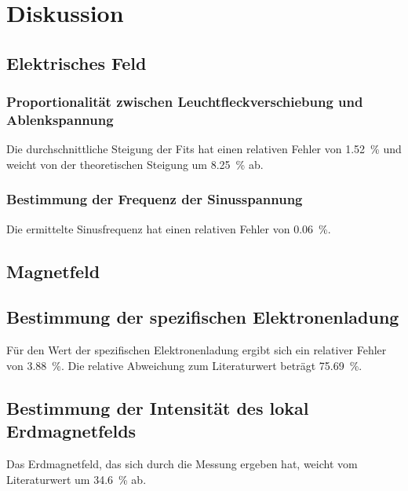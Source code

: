 \section{Diskussion}
\label{sec:Diskussion}

\subsection{Elektrisches Feld}

\subsubsection{Proportionalität zwischen Leuchtfleckverschiebung und Ablenkspannung}
Die durchschnittliche Steigung der Fits hat einen relativen Fehler von \SI{1.52}{\percent} und weicht von der 
theoretischen Steigung um \SI{8.25}{\percent} ab. 

\subsubsection{Bestimmung der Frequenz der Sinusspannung}
Die ermittelte Sinusfrequenz hat einen relativen Fehler von \SI{0.06}{\percent}.


\subsection{Magnetfeld}

\subsection{Bestimmung der spezifischen Elektronenladung}
Für den Wert der spezifischen Elektronenladung ergibt sich ein relativer Fehler von \SI{3.88}{\percent}. Die relative 
Abweichung zum Literaturwert beträgt \SI{75.69}{\percent}. 

\subsection{Bestimmung der Intensität des lokal Erdmagnetfelds}
Das Erdmagnetfeld, das sich durch die Messung ergeben hat, weicht vom Literaturwert um \SI{34.6}{\percent} ab. 
